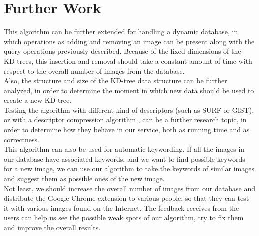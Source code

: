 \section {Further Work}
	This algorithm can be further extended for handling a dynamic database, in which operations as adding and removing an image can be present along with the query operations previously described. Because of the fixed dimensions of the KD-trees, this insertion and removal should take a constant amount of time with respect to the overall number of images from the database.\\
	Also, the structure and size of the KD-tree data structure can be further analyzed, in order to determine the moment in which new data should be used to create a new KD-tree. \\
	Testing the algorithm with different kind of descriptors (such as SURF or GIST), or with a descriptor compression algorithm \cite{descCompression}, can be a further research topic, in order to determine how they behave in our service, both as running time and as correctness.\\
	This algorithm can also be used for automatic keywording. If all the images in our database have associated keywords, and we want to find possible keywords for a new image, we can use our algorithm to take the keywords of similar images and suggest them as possible ones of the new image.\\
	Not least, we should increase the overall number of images from our database and distribute the Google Chrome extension to various people, so that they can test it with various images found on the Internet. The feedback receives from the users can help us see the possible weak spots of our algorithm, try to fix them and improve the overall results.
	